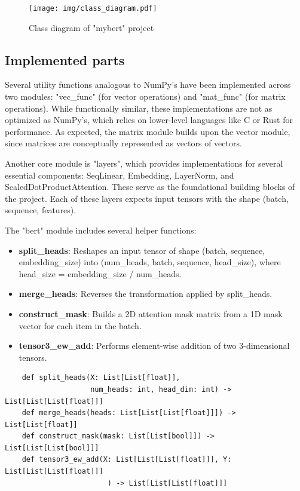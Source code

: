 \documentclass{../../../extra/aakpract/aakpract}
\begin{document}
\begin{figure}[htp]
	\centering
	\texttt{[image: img/class\_diagram.pdf]}
	\caption{Class diagram of "mybert" project}
	\label{fig:mybert}
\end{figure}


\subsection{Implemented parts}


Several utility functions analogous to NumPy's have been implemented across two modules: "vec\_func" (for vector operations) and "mat\_func" (for matrix operations). 
While functionally similar, these implementations are not as optimized as NumPy's, which relies on lower-level languages like C or Rust for performance. 
As expected, the matrix module builds upon the vector module, since matrices are conceptually represented as vectors of vectors.

Another core module is "layers", which provides implementations for several essential components: SeqLinear, Embedding, LayerNorm, and ScaledDotProductAttention. 
These serve as the foundational building blocks of the project. 
Each of these layers expects input tensors with the shape (batch, sequence, features).

The "bert" module includes several helper functions:
\begin{itemize}
	\item \textbf{split\_heads}: Reshapes an input tensor of shape (batch, sequence, embedding\_size) into (num\_heads, batch, sequence, head\_size), where head\_size = embedding\_size / num\_heads.
	
	\item \textbf{merge\_heads}: Reverses the transformation applied by split\_heads.
	
	\item \textbf{construct\_mask}: Builds a 2D attention mask matrix from a 1D mask vector for each item in the batch.
	
	\item \textbf{tensor3\_ew\_add}: Performs element-wise addition of two 3-dimensional tensors.
\end{itemize}

{\footnotesize \begin{verbatim}
	def split_heads(X: List[List[float]], 
	                num_heads: int, head_dim: int) -> List[List[List[float]]]
	def merge_heads(heads: List[List[List[float]]]) -> List[List[float]]
	def construct_mask(mask: List[List[bool]]) -> List[List[List[bool]]]
	def tensor3_ew_add(X: List[List[List[float]]], Y: List[List[List[float]]]
	                    ) -> List[List[List[float]]]
\end{verbatim}}
\end{document}
